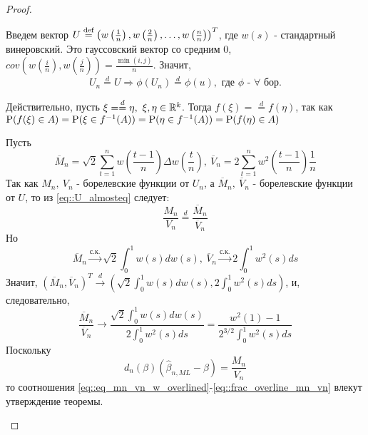 \begin{proof}
\begin{enumerate}
        Введем вектор $U\defeq\left(w\left(\frac{1}{n}\right),w\left(\frac{2}{n}\right),\ldots,w\left(\frac{n}{n}\right)\right)^T$,
        где $w(s)$ - стандартный винеровский. Это гауссовский вектор со средним 0,
        $cov\left(w\left(\frac{i}{n}\right),w\left(\frac{j}{n}\right)\right)=\frac{\min(i,j)}{n}$.
        Значит,
        \begin{equation}\label{eq::U_almosteq}
            U_n\overset{d}{=}U \Rightarrow \phi(U_n)\overset{d}{=}\phi(u),\text{ где $\phi$ - $\forall$ бор.}
        \end{equation}
        \begin{leftbar}
            Действительно, пусть $\xi=\overset{d}{=}\eta,\ \xi,\eta\in\R^k$. Тогда $f(\xi)=\overset{d}{=}f(\eta)$,
            так как $\P(f(\xi)\in A)=\P(\xi\in f^{-1}(A))=\P(\eta\in f^{-1}(A))=\P(f(\eta)\in A)$
        \end{leftbar}
        Пусть
        \[\overline{M}_n=\sqrt{2}\sum_{t=1}^nw\left(\frac{t-1}{n}\right)\Delta w\left(\frac{t}{n}\right),\ \overline{V}_n=2\sum_{t=1}^nw^2\left(\frac{t-1}{n}\right)\frac{1}{n}\]
        Так как $M_n,\ V_n$ - борелевские функции от $U_n$, а $\overline{M}_n,\ \overline{V}_n$ - борелевские функции от $U$,
        то из \eqref{eq::U_almosteq} следует:
        \begin{equation}\label{eq::eq_mn_vn_w_overlined}
            \frac{M_n}{V_n}\overset{d}{=}\frac{\overline{M}_n}{\overline{V}_n}
        \end{equation}
        Но
        \[\overline{M}_n\xrightarrow{\text{с.к.}}\sqrt{2}\int_0^1w(s)dw(s),\ \overline{V}_n\xrightarrow{\text{с.к.}}2\int_0^1w^2(s)ds\]
        Значит, $(\overline{M}_n,\overline{V}_n)^T\xrightarrow{d}\left(\sqrt{2}\int_0^1w(s)dw(s), 2\int_0^1w^2(s)ds\right)$,
        и, следовательно,
        \begin{equation}\label{eq::frac_overline_mn_vn}
            \frac{\overline{M}_n}{\overline{V}_n}\rightarrow\frac{\sqrt{2}\int_0^1w(s)dw(s)}{2\int_0^1w^2(s)ds}=\frac{w^2(1)-1}{2^{3/2}\int^1_0w^2(s)ds}
        \end{equation}
        Поскольку
        \[d_n(\beta)(\widehat{\beta}_{n,ML}-\beta)=\frac{M_n}{V_n}\]
        то соотношения \eqref{eq::eq_mn_vn_w_overlined}-\eqref{eq::frac_overline_mn_vn} влекут утверждение
        теоремы.
    \end{enumerate}
\end{proof}

